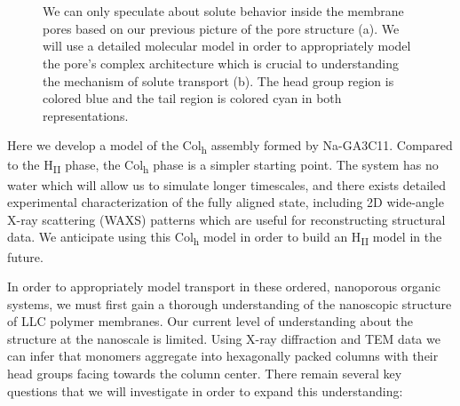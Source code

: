 \documentclass[journal=jpcbfk,manusciprt=article]{achemso}
\begin{document}
\begin{figure}
\begin{subfigure}{0.45\linewidth}
		\caption{}~\label{fig:detailed_pore}
	\end{subfigure}
  \caption{We can only speculate about solute behavior inside the membrane
	  pores based on our previous picture of the pore structure (a). We will use a
	  detailed molecular model in order to appropriately model the pore's complex
	  architecture which is crucial to understanding the mechanism of solute
	  transport (b). The head group region is colored blue
	  and the tail region is colored cyan in both representations.}~\label{fig:detail}
  \end{figure}
 
  Here we develop a model of the Col\textsubscript{h} assembly formed by
  Na-GA3C11. Compared to the H\textsubscript{II} phase, the Col\textsubscript{h}
  phase is a simpler starting point. The system has no water which will allow us
  to simulate longer timescales, and there exists detailed experimental
  characterization of the fully aligned state, including 2D wide-angle X-ray
  scattering (WAXS) patterns which are useful for reconstructing structural data.
  We anticipate using this Col\textsubscript{h} model in order to build an 
  H\textsubscript{II} model in the future.

  In order to appropriately model transport in these ordered, nanoporous
  organic systems, we must first gain a thorough understanding of the nanoscopic
  structure of LLC polymer membranes. Our current level of understanding about
  the structure at the nanoscale is limited. Using X-ray diffraction and TEM data
  we can infer that monomers aggregate into hexagonally packed columns with their
  head groups facing towards the column center. There remain several key questions
  that we will investigate in order to expand this understanding: 
\end{document}
